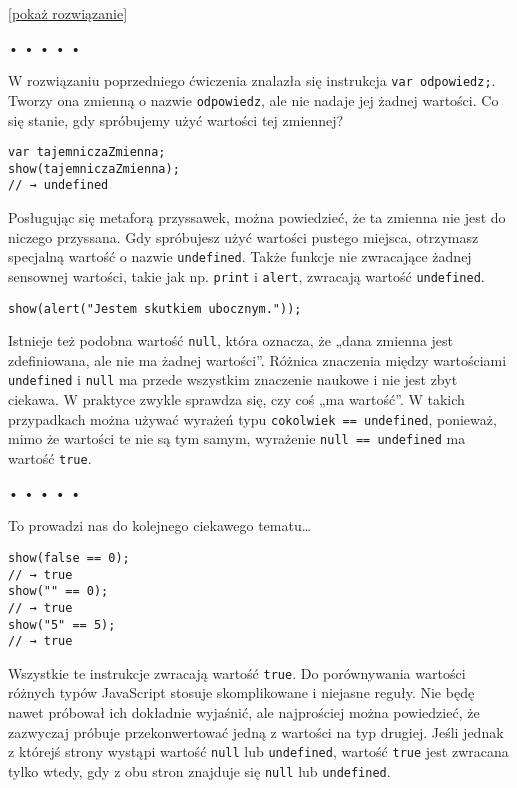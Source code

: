     
[\hyperref[sol:2.6]{pokaż rozwiązanie}]
    
    
\begin{center}
• • • • •
\end{center}


W rozwiązaniu poprzedniego ćwiczenia znalazła się instrukcja \texttt{var odpowiedz;}. Tworzy ona zmienną o nazwie \texttt{odpowiedz}, ale nie nadaje jej żadnej wartości. Co się stanie, gdy spróbujemy użyć wartości tej zmiennej?

\begin{verbatim} 
var tajemniczaZmienna;
show(tajemniczaZmienna);
// → undefined
\end{verbatim}
    
Posługując się metaforą przyssawek, można powiedzieć, że ta zmienna nie jest do niczego przyssana. Gdy spróbujesz użyć wartości pustego miejsca, otrzymasz specjalną wartość o nazwie \texttt{undefined}. Także funkcje nie zwracające żadnej sensownej wartości, takie jak np. \texttt{print} i \texttt{alert}, zwracają wartość \texttt{undefined}.

\begin{verbatim} 
show(alert("Jestem skutkiem ubocznym."));
\end{verbatim}

    
Istnieje też podobna wartość \texttt{null}, która oznacza, że „dana zmienna jest zdefiniowana, ale nie ma żadnej wartości”. Różnica znaczenia między wartościami \texttt{undefined} i \texttt{null} ma przede wszystkim znaczenie naukowe i nie jest zbyt ciekawa. W praktyce zwykle sprawdza się, czy coś „ma wartość”. W takich przypadkach można używać wyrażeń typu \texttt{cokolwiek == undefined}, ponieważ, mimo że wartości te nie są tym samym, wyrażenie \texttt{null == undefined} ma wartość \texttt{true}.

  
\begin{center}
• • • • •
\end{center}
  
    
To prowadzi nas do kolejnego ciekawego tematu…

\begin{verbatim} 
show(false == 0);
// → true
show("" == 0);
// → true
show("5" == 5);
// → true
\end{verbatim}
    
Wszystkie te instrukcje zwracają wartość \texttt{true}. Do porównywania wartości różnych typów JavaScript stosuje skomplikowane i niejasne reguły. Nie będę nawet próbował ich dokładnie wyjaśnić, ale najprościej można powiedzieć, że zazwyczaj próbuje przekonwertować jedną z wartości na typ drugiej. Jeśli jednak z którejś strony wystąpi wartość \texttt{null} lub \texttt{undefined}, wartość \texttt{true} jest zwracana tylko wtedy, gdy z obu stron znajduje się \texttt{null} lub \texttt{undefined}.

